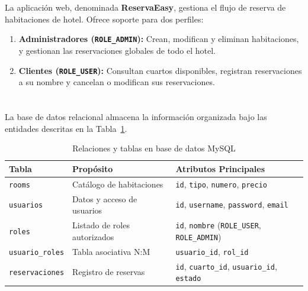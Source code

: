 \documentclass[10pt,a4paper]{article}
\begin{document}
\pagebreak

\section{\color{colorIPN}{Descripción del sistema}}

La aplicación web, denominada \textbf{ReservaEasy}, gestiona el flujo de reserva de habitaciones de hotel. Ofrece soporte para dos perfiles:
\begin{enumerate}
    \item \textbf{Administradores (\texttt{ROLE\_ADMIN}):} Crean, modifican y eliminan habitaciones, y gestionan las reservaciones globales de todo el hotel.
    \item \textbf{Clientes (\texttt{ROLE\_USER}):} Consultan cuartos disponibles, registran reservaciones a su nombre y cancelan o modifican sus reservaciones.
\end{enumerate}

\pagebreak

\section{\color{colorIPN}{Modelo de base de datos}}

La base de datos relacional almacena la información organizada bajo las entidades descritas en la Tabla~\ref{tabla:TablasT3}.

\begin{table}[htb]
    \centering
    \begin{tabular}{p{3.5cm}|p{5cm}|p{4.5cm}}\hline \hline
        Tabla     & Propósito  & Atributos Principales \\ \hline \hline
        \texttt{rooms} & Catálogo de habitaciones & \texttt{id}, \texttt{tipo}, \texttt{numero}, \texttt{precio} \\ \hline
        \texttt{usuarios} & Datos y acceso de usuarios & \texttt{id}, \texttt{username}, \texttt{password}, \texttt{email} \\ \hline
        \texttt{roles} & Listado de roles autorizados & \texttt{id}, \texttt{nombre} (\texttt{ROLE\_USER}, \texttt{ROLE\_ADMIN}) \\ \hline
        \texttt{usuario\_roles} & Tabla asociativa N:M & \texttt{usuario\_id}, \texttt{rol\_id} \\ \hline
        \texttt{reservaciones} & Registro de reservas & \texttt{id}, \texttt{cuarto\_id}, \texttt{usuario\_id}, \texttt{estado} \\ \hline \hline
    \end{tabular}
    \caption{Relaciones y tablas en base de datos MySQL}
    \label{tabla:TablasT3}
\end{table}
\end{document}
